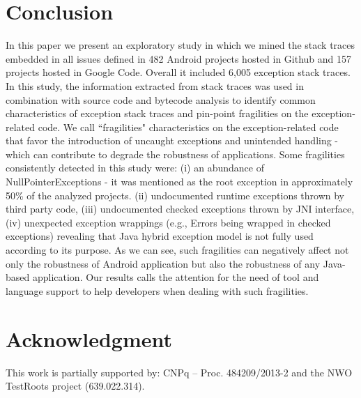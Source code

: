 \documentclass[conference]{IEEEtran}
\begin{document}
\enlargethispage{-2\baselineskip}

\section{Conclusion}
\label{sec:conc}

In this paper we present an exploratory study in which we mined the stack 
traces embedded in all issues defined in 482 Android projects hosted in Github and 
157 projects hosted in Google Code. Overall it included 6,005 exception stack traces.
In this study, the information extracted from stack traces was used in combination 
with source code and bytecode analysis to identify common characteristics of exception 
stack traces and pin-point fragilities on the exception-related code. 
We call ``fragilities" characteristics on the exception-related code that favor the introduction
of  uncaught exceptions and unintended handling - which can contribute to 
degrade the robustness of applications.
Some fragilities consistently detected in this study were: 
(i) an abundance of NullPointerExceptions - it was mentioned as the root exception in approximately 
50\% of the analyzed projects. 
(ii) undocumented runtime exceptions thrown by third party code,
(iii) undocumented checked exceptions thrown by JNI interface,
(iv) unexpected exception wrappings (e.g., Errors being wrapped in checked exceptions) 
revealing that Java hybrid exception model is not fully used according to its purpose.
As we can see, such fragilities can negatively affect not only the robustness of Android application 
but also the robustness of any Java-based application. 
Our results calls the attention for the need of tool and language support to help 
developers when dealing with such fragilities.

 



\section*{Acknowledgment} This work is partially supported by: CNPq -- Proc.
484209/2013-2 and the NWO TestRoots project (639.022.314).





\end{document}
